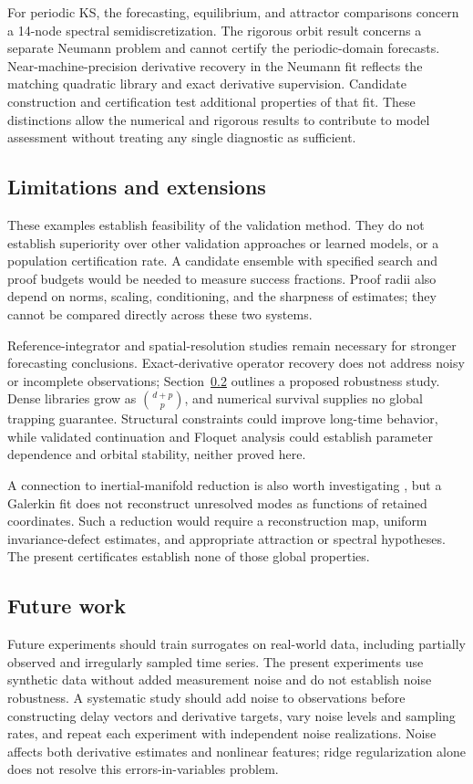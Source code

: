 \documentclass[11pt]{article}
\begin{document}
For periodic KS, the forecasting, equilibrium, and attractor comparisons
concern a 14-node spectral semidiscretization. The rigorous orbit result
concerns a separate Neumann problem and cannot certify the periodic-domain
forecasts. Near-machine-precision derivative recovery in the Neumann fit
reflects the matching quadratic library and exact derivative supervision.
Candidate construction and certification test additional properties of that
fit. These distinctions allow the numerical and rigorous results to contribute
to model assessment without treating any single diagnostic as sufficient.

\subsection{Limitations and extensions}
These examples establish feasibility of the validation method. They do not
establish superiority over other validation approaches or learned models, or a
population certification rate. A candidate ensemble with specified search
and proof budgets would be needed to measure success fractions. Proof radii
also depend on norms, scaling, conditioning, and the sharpness of estimates;
they cannot be compared directly across these two systems.

Reference-integrator and spatial-resolution studies remain necessary for
stronger forecasting conclusions. Exact-derivative operator recovery does not
address noisy or incomplete observations; Section~\ref{sec:future-work}
outlines a proposed robustness study. Dense libraries grow as $\binom{d+p}{p}$,
and numerical survival supplies no global trapping guarantee. Structural
constraints could improve long-time behavior, while validated continuation
and Floquet analysis could establish parameter dependence and orbital
stability, neither proved here.

A connection to inertial-manifold reduction is also worth investigating
\cite{foias1988,zelik2014}, but a Galerkin fit does not reconstruct unresolved
modes as functions of retained coordinates. Such a reduction would require a
reconstruction map, uniform invariance-defect estimates, and appropriate
attraction or spectral hypotheses. The present certificates establish none
of those global properties.

\subsection{Future work}
\label{sec:future-work}
Future experiments should train surrogates on real-world data, including
partially observed and irregularly sampled time series. The present experiments
use synthetic data without added measurement noise and do not establish noise
robustness. A systematic study should add noise to observations before
constructing delay vectors and derivative targets, vary noise levels and
sampling rates, and repeat each experiment with independent noise realizations.
Noise affects both derivative estimates and nonlinear features; ridge
regularization alone does not resolve this errors-in-variables problem.
\end{document}
